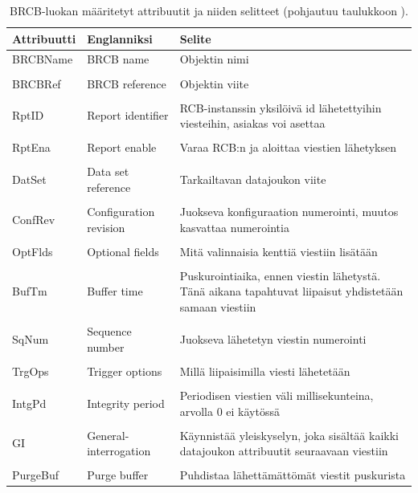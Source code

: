 \begin{table}[ht!]
	\caption{BRCB-luokan määritetyt attribuutit ja niiden selitteet (pohjautuu taulukkoon \mbox{\cite[s.~94]{IEC61850-7-2}}).}
	\label{tab:iec61850-brcb-class-definition}
	\begin{tabular}{l | l | l}
		\hline
		\textbf{Attribuutti} & \textbf{Englanniksi} & \textbf{Selite} \\
		\hline \hline
		BRCBName & BRCB name & Objektin nimi \\
		&\\
		BRCBRef & BRCB reference & Objektin viite \\
		&\\
		RptID & Report identifier & \parbox[t]{7.5cm}{RCB-instanssin yksilöivä id lähetettyihin viesteihin, asiakas voi asettaa} \\
		&\\
		RptEna & Report enable & Varaa RCB:n ja aloittaa viestien lähetyksen \\
		&\\
		DatSet & Data set reference & Tarkailtavan datajoukon viite \\
		&\\
		ConfRev & Configuration revision & \parbox[t]{7.5cm}{Juokseva konfiguraation numerointi, muutos kasvattaa numerointia} \\
		&\\
		OptFlds & Optional fields & Mitä valinnaisia kenttiä viestiin lisätään \\
		&\\
		BufTm & Buffer time & \parbox[t]{7.5cm}{Puskurointiaika, ennen viestin lähetystä. Tänä aikana tapahtuvat liipaisut yhdistetään samaan viestiin} \\
		&\\
		SqNum & Sequence number & Juokseva lähetetyn viestin numerointi \\
		&\\
		TrgOps & Trigger options & Millä liipaisimilla viesti lähetetään \\
		&\\
		IntgPd & Integrity period & \parbox[t]{7.5cm}{Periodisen viestien väli millisekunteina, arvolla 0 ei käytössä} \\
		&\\
		GI & General-interrogation & \parbox[t]{7.5cm}{Käynnistää yleiskyselyn, joka sisältää kaikki datajoukon attribuutit seuraavaan viestiin} \\
		&\\
		PurgeBuf & Purge buffer & Puhdistaa lähettämättömät viestit puskurista \\

\end{tabular}
\end{table}
